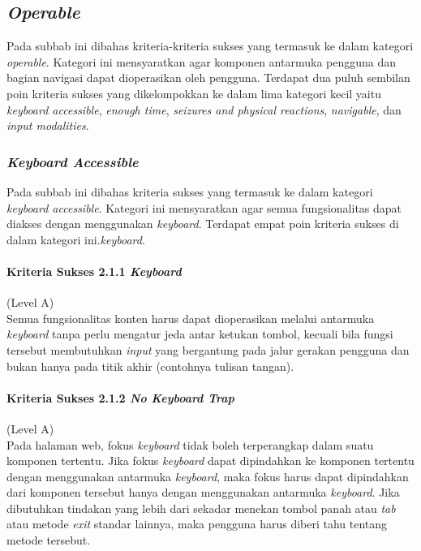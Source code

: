 

\subsection{\textit{Operable}}
\label{sec:operable}
Pada subbab ini dibahas kriteria-kriteria sukses yang termasuk ke dalam kategori \textit{operable}. Kategori ini mensyaratkan agar komponen antarmuka pengguna dan bagian navigasi dapat dioperasikan oleh pengguna. Terdapat dua puluh sembilan poin kriteria sukses yang dikelompokkan ke dalam lima kategori kecil yaitu \textit{keyboard accessible}, \textit{enough time}, \textit{seizures and physical reactions}, \textit{navigable}, dan \textit{input modalities}.

\subsubsection{\textit{Keyboard Accessible}}
\label{sec:keyboard_accessible}
Pada subbab ini dibahas kriteria sukses yang termasuk ke dalam kategori \textit{keyboard accessible}. Kategori ini mensyaratkan agar semua fungsionalitas dapat diakses dengan menggunakan \textit{keyboard}. Terdapat empat poin kriteria sukses di dalam kategori ini.\textit{keyboard}.

\paragraph{Kriteria Sukses 2.1.1 \textit{Keyboard}}
\label{sec:kriteria_sukses_2.1.1}
(Level A)\\

Semua fungsionalitas konten harus dapat dioperasikan melalui antarmuka \textit{keyboard} tanpa perlu mengatur jeda antar ketukan tombol, kecuali bila fungsi tersebut membutuhkan \textit{input} yang bergantung pada jalur gerakan pengguna dan bukan hanya pada titik akhir (contohnya tulisan tangan).

\paragraph{Kriteria Sukses 2.1.2 \textit{No Keyboard Trap}}
\label{sec:kriteria_sukses_2.1.2}
(Level A)\\

Pada halaman web, fokus \textit{keyboard} tidak boleh terperangkap dalam suatu komponen tertentu. Jika fokus \textit{keyboard} dapat dipindahkan ke komponen tertentu dengan menggunakan antarmuka \textit{keyboard}, maka fokus harus dapat dipindahkan dari komponen tersebut hanya dengan menggunakan antarmuka \textit{keyboard}. Jika dibutuhkan tindakan yang lebih dari sekadar menekan tombol panah atau \textit{tab} atau metode \textit{exit} standar lainnya, maka pengguna harus diberi tahu tentang metode tersebut.

